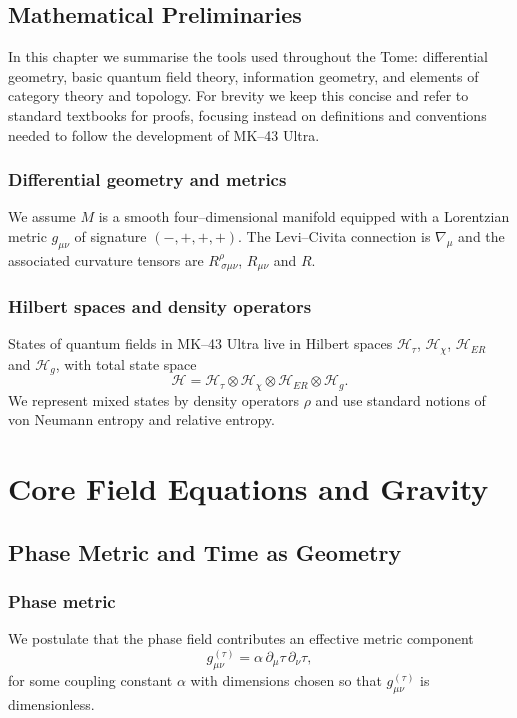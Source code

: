 \documentclass[11pt]{book}
\begin{document}
\chapter{Mathematical Preliminaries}

In this chapter we summarise the tools used throughout the Tome: differential geometry, basic quantum field theory, information geometry, and elements of category theory and topology.
For brevity we keep this concise and refer to standard textbooks for proofs, focusing instead on definitions and conventions needed to follow the development of MK--43 Ultra.

\section{Differential geometry and metrics}

We assume $M$ is a smooth four--dimensional manifold equipped with a Lorentzian metric $g_{\mu\nu}$ of signature $(-,+,+,+)$.
The Levi--Civita connection is $\nabla_\mu$ and the associated curvature tensors are $R^\rho_{\ \sigma\mu\nu}$, $R_{\mu\nu}$ and $R$.

\section{Hilbert spaces and density operators}

States of quantum fields in MK--43 Ultra live in Hilbert spaces $\mathcal{H}_\tau$, $\mathcal{H}_\chi$, $\mathcal{H}_{ER}$ and $\mathcal{H}_g$, with total state space
\[
  \mathcal{H} = \mathcal{H}_\tau \otimes \mathcal{H}_\chi \otimes \mathcal{H}_{ER} \otimes \mathcal{H}_g.
\]
We represent mixed states by density operators $\rho$ and use standard notions of von Neumann entropy and relative entropy.

\part{Core Field Equations and Gravity}

\chapter{Phase Metric and Time as Geometry}

\section{Phase metric}

We postulate that the phase field contributes an effective metric component
\begin{equation}
  g^{(\tau)}_{\mu\nu} = \alpha\, \partial_\mu \tau\, \partial_\nu \tau,
  \label{eq:phase-metric}
\end{equation}
for some coupling constant $\alpha$ with dimensions chosen so that $g^{(\tau)}_{\mu\nu}$ is dimensionless.
\end{document}

